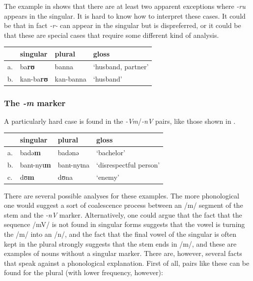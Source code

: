 The example in  shows that there are at least two apparent exceptions where \textit{-ru} appears in the singular. It is hard to know how to interpret these cases. It could be that in fact \textit{-r-} can appear in the singular but is dispreferred, or it could be that these are special cases that require some different kind of analysis.

\begin{exe}
    \ex \label{rusg-kasem-2}
    \begin{tabular}[t]{llll}
      & singular & plural    & gloss              \\
      \midrule
      a. & ba\textbf{rʊ}     & banna     & `husband, partner' \\
      b. & kan-ba\textbf{rʊ} & kan-banna & `husband'          \\
    \end{tabular}
\end{exe}

\subsubsection{The \textit{-m} marker}

\largerpage 
A particularly hard case is found in the \textit{-Vm}/\textit{-nV} pairs, like those shown in .

\begin{exe}
    \ex \label{nm-exe}
    \begin{tabular}[t]{llll}
      & singular  & plural     & gloss                  \\
      \midrule
      a. & badə\textbf{m}     & badənə     & `bachelor'             \\
      b. & banɩ-nyɩ\textbf{m} & banɩ-nyɩna & `disrespectful person' \\
      c. & dʊ\textbf{m}       & dʊna       & `enemy'                \\
    \end{tabular}
\end{exe}

There are several possible analyses for these examples. The more phonological one would suggest a sort of coalescence process between an /m/ segment of the stem and the \textit{-nV} marker. Alternatively, one could argue that the fact that the sequence /mV/ is not found in singular forms suggests that the vowel is turning the /m/ into an /n/, and the fact that the final vowel of the singular is often kept in the plural strongly suggests that the stem ends in /m/, and these are examples of nouns without a singular marker. There are, however, several facts that speak against a phonological explanation. First of all, pairs like these can be found for the plural (with lower frequency, however):


